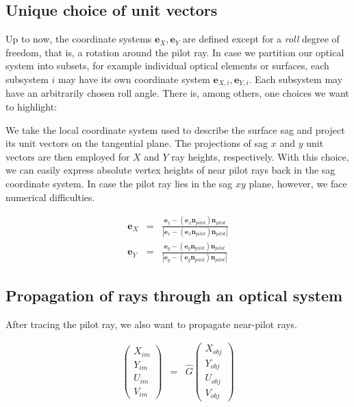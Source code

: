 \documentclass[12pt,a4paper,twoside,openright,BCOR10mm,headsepline,titlepage,abstracton,chapterprefix,final]{scrreprt}
\newcommand\Vector[1]{{\mathbf{#1}}}
\begin{document}
\subsection{Unique choice of unit vectors}
Up to now, the coordinate systems $\Vector{e}_{X}, \Vector{e}_{Y}$ are defined except for a \emph{roll} degree of freedom, that is, a rotation around the pilot ray.
In case we partition our optical system into subsets, for example individual optical elements or surfaces, each subsystem $i$ may have its own coordinate system
$\Vector{e}_{X,i}, \Vector{e}_{Y,i}$.
Each subsystem may have an arbitrarily chosen roll angle. 
There is, among others, one choices we want to highlight:

We take the local coordinate system used to describe the surface sag and project its unit vectors on the tangential plane.
The projections of sag $x$ and $y$ unit vectors are then employed for $X$ and $Y$ ray heights, respectively.
With this choice, we can easily express absolute vertex heights of near pilot rays back in the sag coordinate system. 
In case the pilot ray lies in the sag $xy$ plane, however, we face numerical difficulties.

\begin{eqnarray}
 \Vector{e}_{X} &=& \frac{\Vector{e}_{x} - (\Vector{e}_{x}\Vector{n}_{pilot})\Vector{n}_{pilot}}{|\Vector{e}_{x} - (\Vector{e}_{x}\Vector{n}_{pilot})\Vector{n}_{pilot}|}
 \\[2ex]
 \Vector{e}_{Y} &=& \frac{\Vector{e}_{y} - (\Vector{e}_{y}\Vector{n}_{pilot})\Vector{n}_{pilot}}{|\Vector{e}_{y} - (\Vector{e}_{y}\Vector{n}_{pilot})\Vector{n}_{pilot}|}
\end{eqnarray}


\subsection{Propagation of rays through an optical system}

After tracing the pilot ray, we also want to propagate near-pilot rays.

\begin{eqnarray}
 \begin{pmatrix}
  X_{im} \\ Y_{im} \\ U_{im} \\ V_{im}
 \end{pmatrix}
 &=&
 \hat{G}
 \begin{pmatrix}
  X_{obj} \\ Y_{obj} \\ U_{obj} \\ V_{obj}
 \end{pmatrix}
\end{eqnarray}
\end{document}
